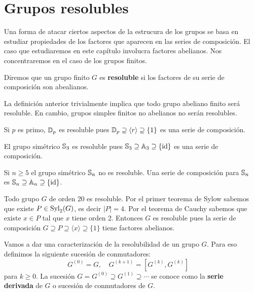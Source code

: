 \chapter{Grupos resolubles}

Una forma de atacar ciertos aspectos de la estrucura de los grupos se basa en estudiar propiedades de los factores que aparecen en las series de composición. El caso que estudiaremos en este capítulo involucra factores abelianos. Nos concentraremos en el caso de los grupos finitos. 

\begin{definition}
Diremos que un grupo finito $G$ es \textbf{resoluble} si los factores de su serie de composición son abealianos. 	
\end{definition}

La definición anterior trivialmente implica que todo grupo abeliano finito será resoluble. En cambio, grupos simples finitos no abelianos no serán resolubles. 

\begin{example}
Si $p$ es primo, $\mathbb{D}_p$ es resoluble pues $\mathbb{D}_p\supseteq\langle r\rangle\supseteq\{1\}$ es una serie de composición. 	
\end{example}

\begin{example}
El grupo simétrico $\mathbb{S}_3$ es resoluble pues $\mathbb{S}_3\supseteq\mathbb{A}_3\supseteq\{\operatorname{id}\}$ es una serie de composición.	
\end{example}

\begin{example}
	Si $n\geq5$ el grupo simétrico $\mathbb{S}_n$ no es resoluble. Una serie de composición para $\mathbb{S}_n$ es $\mathbb{S}_n\supseteq\mathbb{A}_n\supseteq\{\operatorname{id}\}$. 
\end{example}

\begin{example}
Todo grupo $G$ de orden 20 es resoluble. Por el primer teorema de Sylow sabemos que existe $P\in\mathrm{Syl}_2(G)$, es decir
$|P|=4$. Por el teorema de Cauchy sabemos que existe $x\in P$ tal que $x$ tiene orden 2. Entonces $G$ es resoluble pues la serie de composición  
$G\supseteq P\supseteq\langle x\rangle\supseteq \{1\}$ tiene factores abelianos. 
\end{example}

Vamos a dar una caracterización de la resolubilidad de un grupo $G$. Para eso definimos la siguiente sucesión de conmutadores:
\[
G^{(0)}=G,\quad
G^{(k+1)}=[G^{(k)},G^{(k)}]
\]
para $k\geq0$. La sucesión $G=G^{(0)}\supseteq G^{(1)}\supseteq\cdots$ se conoce como la \textbf{serie derivada} de $G$ o sucesión de conmutadores de $G$. 


